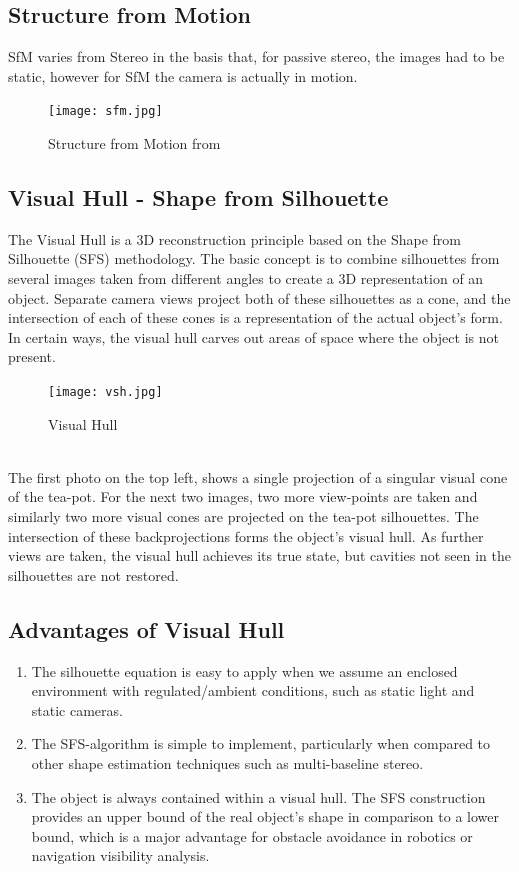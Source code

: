 \documentclass[a4paper]{report}
\begin{document}
\subsection{Structure  from Motion}
SfM varies from Stereo in the basis that, for passive stereo, the images had to be static, however for SfM the camera is actually in motion.

\begin{figure}[h]
\texttt{[image: sfm.jpg]} 
\caption{Structure from Motion from }
\end{figure}


\subsection{Visual Hull - Shape from Silhouette}
The Visual Hull is a 3D reconstruction principle based on the Shape from Silhouette (SFS) methodology. The basic concept is to combine silhouettes from several images taken from different angles to create a 3D representation of an object. Separate camera views project both of these silhouettes as a cone, and the intersection of each of these cones is a representation of the actual object's form. In certain ways, the visual hull carves out areas of space where the object is not present.
\begin{figure}[h]
\texttt{[image: vsh.jpg]} 
\caption{ Visual Hull}

\end{figure}
\\
The first photo on the top left, shows a single projection of a singular visual cone of the tea-pot. For the next two images, two more view-points are taken and similarly two more visual cones are projected on the tea-pot silhouettes.
The intersection of these backprojections forms the object's visual hull.
As further views are taken, the visual hull achieves its true state, but cavities not seen in the silhouettes are not restored.
\newpage
\subsection{Advantages of Visual Hull}

\begin{enumerate}
\item The silhouette equation is easy to apply when we assume an enclosed environment with regulated/ambient conditions, such as static light and static cameras.
\item The SFS-algorithm is simple to implement, particularly when compared to other shape estimation techniques such as multi-baseline stereo.
\item The object is always contained within a visual  hull. The SFS construction provides an upper bound of the real object's shape in comparison to a lower bound, which is a major advantage for obstacle avoidance in robotics or navigation visibility analysis.
\end{enumerate}
\end{document}
